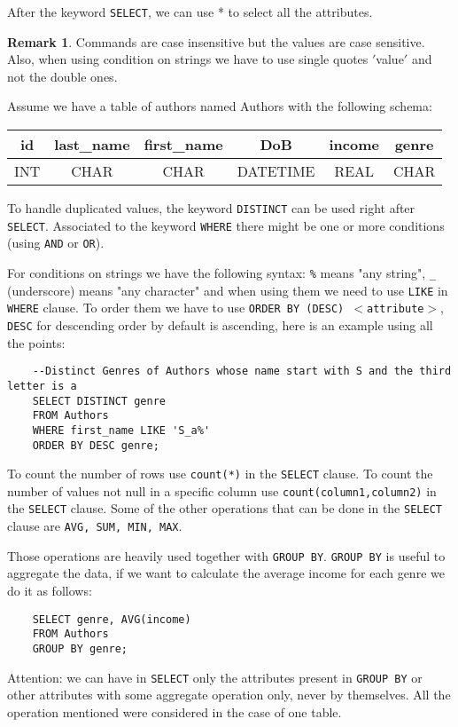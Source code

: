 \documentclass[a4page, 11pt]{article}
\theoremstyle{definition}
\newtheorem*{remark}{Remark}
\begin{document}
After the keyword \texttt{SELECT}, we can use * to select all the attributes. 
\begin{remark}
Commands are case insensitive but the values are case sensitive. Also, when using condition on strings we have to use single quotes $'$value$'$ and not the double ones.
\end{remark}
Assume we have a table of authors named Authors with the following schema:
\begin{table}[h]
	\centering
	\begin{tabular}{c | c | c |c | c|  c}
		id & last\_name & first\_name & DoB & income & genre\\
		\hline
		INT & CHAR & CHAR & DATETIME & REAL & CHAR\\
	\end{tabular}
\end{table}


To handle duplicated values, the keyword \texttt{DISTINCT} can be used right after \texttt{SELECT}. Associated to the keyword \texttt{WHERE} there might be one or more conditions (using \texttt{AND} or \texttt{OR}).

For conditions on strings we have the following syntax: \texttt{\%} means "any string", \texttt{\_} (underscore) means "any character" and when using them we need to use \texttt{LIKE} in \texttt{WHERE} clause. To order them we have to use \texttt{ORDER BY (DESC) $<$attribute$>$}, \texttt{DESC} for descending order by default is ascending, here is an example using all the points:

\begin{lstlisting}
	--Distinct Genres of Authors whose name start with S and the third letter is a
	SELECT DISTINCT genre
	FROM Authors
	WHERE first_name LIKE 'S_a%'
	ORDER BY DESC genre;
\end{lstlisting}

To count the number of rows use \texttt{count(*)} in the \texttt{SELECT} clause. To count the number of values not null in a specific column use \texttt{count(column1,column2)} in the \texttt{SELECT} clause. Some of the other operations that can be done in the \texttt{SELECT} clause are \texttt{AVG, SUM, MIN, MAX}.

Those operations are heavily used together with \texttt{GROUP BY}. \texttt{GROUP BY}  is useful to aggregate the data, if we want to calculate the average income for each genre we do it as follows:
\begin{lstlisting}
	SELECT genre, AVG(income)
	FROM Authors
	GROUP BY genre;
\end{lstlisting}
Attention: we can have in \texttt{SELECT} only the attributes present in \texttt{GROUP BY} or other attributes with some aggregate operation only, never by themselves. All the operation mentioned were considered in the case of one table.
\end{document}
